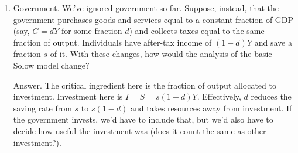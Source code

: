 \begin{enumerate}
\item Government.  We've ignored government so far.  Suppose, instead,
that the government purchases goods and services
equal to a constant fraction of GDP
(say, $ G = d Y$ for some fraction $d$)
 and collects taxes equal to the same fraction of output.
Individuals have after-tax income of $ (1-d) Y$ and save a
fraction $s$ of it.
With these changes, how would the analysis of the basic Solow model change?

Answer.  The critical ingredient here is the fraction of output allocated
to investment.
Investment here is $ I = S = s (1-d) Y $.
Effectively, $d$ reduces the saving rate from $s$ to $s(1-d)$
and takes resources away from investment.
If the government invests, we'd have to include that,
but we'd also have to decide how useful the investment was
(does it count the same as other investment?).

\begin{comment}
\item Population growth.
Consider the model with population growth, and suppose
that $\delta = 0.1$, $s = 0.2$, $A = 1$, and $g_l = 0.01$. How much does
steady-state output per worker fall if $g_l$ rises to 0.02? \\
Warning:  This is moderately difficult.
You can't apply a formula from the text,
you need to work out the steady state on your own.

Answer.  In this case and others like it,
what's constant in a steady state is $K/Y$,
meaning $K$ and $Y$ grow at the same rate.
Call this rate $g$; it implies, for example,
$ Y_{t+1} = (1+g) Y_t$, and the same for $K_t$.
The critical inputs are the dynamics of capital and the production function.
Let's take them one at a time.

(i) Capital.  Consider the dynamics of
capital in a steady state.
We divide equation (\ref{eq:k}) by $Y_t = Y_{t+1}/(1+g)$ to get
\begin{eqnarray*}
    (1+g) (K_{t+1}/Y_{t+1}) &=& (1-\delta) (K_t/Y_t) + s.
\end{eqnarray*}
In a steady state where $K/Y$ is constant, we have
$ (g+\delta) (K/Y) = s $.

(ii) Production function.  Take the ratio of equation
(\ref{eq:pf_solow}) at date $t+1$ to the same equation at date $t$:
\begin{eqnarray*}
    (Y_{t+1}/Y_t) &=& (A_{t+1}/A_t) (K_{t+1}/K_t)^\alpha (L_{t+1}/L_t)^{1-\alpha} .
\end{eqnarray*}
Our assumptions about growth rates gives us
$ (1+g) = (1+g)^\alpha (1+g_l)^{1-\alpha} $,
or $ (1+g) = (1+g_l)$.
Returning to (i), we see that
$ K/Y = s/(g_l+\delta) $.


\end{comment}
\end{enumerate}
